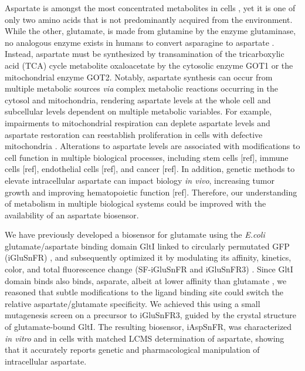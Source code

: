 \documentclass[9pt,lineno]{elife}
\begin{document}
Aspartate is amongst the most concentrated metabolites in cells \citep{Park2016-ap}, yet it is one of only two amino acids that is not predominantly acquired from the environment.
While the other, glutamate, is made from glutamine by the enzyme glutaminase, no analogous enzyme exists in humans to convert asparagine to aspartate \citep{Sullivan2018-gz}.
Instead, aspartate must be synthesized by transamination of the tricarboxylic acid (TCA) cycle metabolite oxaloacetate by the cytosolic enzyme GOT1 or the mitochondrial enzyme GOT2.
Notably, aspartate synthesis can occur from multiple metabolic sources \textit{via} complex metabolic reactions occurring in the cytosol and mitochondria, rendering aspartate levels at the whole cell and subcellular levels dependent on multiple metabolic variables.
For example, impairments to mitochondrial respiration can deplete aspartate levels and aspartate restoration can reestablish proliferation in cells with defective mitochondria \citep{Sullivan2015-xf, Birsoy2015-pg}.
Alterations to aspartate levels are associated with modifications to cell function in multiple biological processes, including stem cells [ref], immune cells [ref], endothelial cells [ref], and cancer [ref].
In addition, genetic methods to elevate intracellular aspartate can impact biology \textit{in vivo}, increasing tumor growth \citep{Sullivan2018-gz, Garcia-Bermudez2018-mj} and improving hematopoietic function [ref].
Therefore, our understanding of metabolism in multiple biological systems could be improved with the availability of an aspartate biosensor.


We have previously developed a biosensor for glutamate using the \textit{E.coli} glutamate/aspartate binding domain GltI linked to circularly permutated GFP (iGluSnFR) \citep{Marvin2013-qq}, and subsequently optimized it by modulating its affinity, kinetics, color, and total fluorescence change (SF-iGluSnFR and iGluSnFR3) \citep{Marvin2018-ks, Aggarwal2023-pi}.
Since GltI domain binds also binds, asparate, albeit at lower affinity than glutamate  \citep{Hu2008-nd}, we reasoned that subtle modifications to the ligand binding site could switch the relative aspartate/glutamate specificity.
We achieved this using a small mutagenesis screen on a precursor to iGluSnFR3, guided by the crystal structure of glutamate-bound GltI.
The resulting biosensor, iAspSnFR, was characterized \textit{in vitro} and in cells with matched LCMS determination of aspartate, showing that it accurately reports genetic and pharmacological manipulation of intracellular aspartate.
\end{document}
